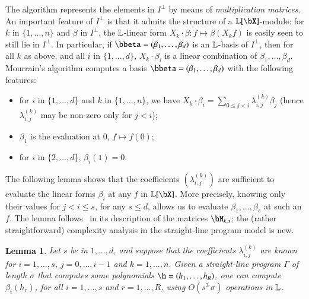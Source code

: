 \documentclass[amsthm]{elsart}
\newtheorem{lemma}[definition]{Lemma}
\begin{document}
The algorithm represents the elements in $I^{\perp}$ by means of {\em
  multiplication matrices}. An important feature of $I^{\perp}$ is
that it admits the structure of a $\LL[\bX]$-module: for $k$ in
$\{1,\dots,n\}$ and $\beta$ in $I^{\perp}$, the $\mathbb{L}$-linear form $X_k
\cdot \beta: f \mapsto \beta(X_k f)$ is easily seen to still lie in
$I^{\perp}$.  In particular, if
$\bbeta=(\beta_1,\dots,\beta_d)$ is an $\mathbb{L}$-basis of
$I^{\perp}$, then for all $k$ as above, and all $i$ in
$\{1,\dots,d\}$, $X_k \cdot \beta_i$ is a linear combination of
$\beta_1,\dots,\beta_d$. Mourrain's algorithm computes a basis
$\bbeta=(\beta_1,\dots,\beta_d)$ with the following features:
\begin{itemize}
\item for $i$ in $\{1,\dots,d\}$ and $k$ in $\{1,\dots,n\}$, we have
  $X_k \cdot \beta_i=\sum_{0 \le j < i} \lambda^{(k)}_{i,j} \beta_j$
  (hence $\lambda^{(k)}_{i,j}$ may be non-zero 
  only for $j<i$);
\item $\beta_1$ is the evaluation at $0$, $f \mapsto f(0)$;
\item for $i$ in $\{2,\dots,d\}$, $\beta_i(1)=0$.
\end{itemize}
The following lemma shows that the coefficients $(\lambda^{(k)}_{i,j})$
are sufficient to evaluate  the linear forms $\beta_i$ at any $f$ in
$\LL[\bX]$. More precisely, knowing only their values for $j < i \le s$,
for any $s \le d$, allows us to evaluate $\beta_1,\dots,\beta_s$ at such an $f$.
The lemma follows~\cite{Mourrain97} in its description
of the matrices $\bM_{k,s}$; the (rather straightforward) complexity analysis 
in the straight-line program model is new.
\begin{lemma}\label{lemma:evalbeta}
   Let $s$ be in $1,\dots,d$, and suppose that the coefficients
  $\lambda^{(k)}_{i,j}$ are known for $i=1,\dots,s$, $j=0,\dots,i-1$
  and $k=1,\dots,n$. Given a straight-line program $\Gamma$ of length
  $\sigma$ that computes some polynomials $\h=(h_1,\dots,h_R)$, one can compute
  $\beta_i(h_r)$, for all $i=1,\dots,s$ and $r=1,\dots,R$, using
  $O(s^3\,\sigma)$ operations in $\mathbb{L}$.
\end{lemma}
\end{document}
